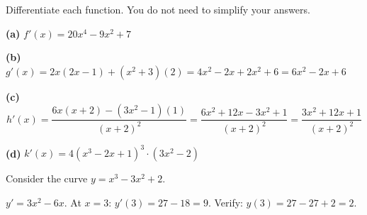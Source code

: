 \documentclass[addpoints]{exam}
\begin{document}
\begin{questions}
\question Differentiate each function. You do not need to simplify your answers.
\begin{solution}[8cm]
\textbf{(a)} $f'(x) = 20x^4 - 9x^2 + 7$

\textbf{(b)} $g'(x) = 2x(2x-1) + (x^2+3)(2) = 4x^2 - 2x + 2x^2 + 6 = 6x^2 - 2x + 6$

\textbf{(c)}
\[
h'(x) = \frac{6x(x+2) - (3x^2-1)(1)}{(x+2)^2} = \frac{6x^2+12x - 3x^2+1}{(x+2)^2}
= \frac{3x^2 + 12x + 1}{(x+2)^2}
\]

\textbf{(d)} $k'(x) = 4(x^3 - 2x + 1)^3 \cdot (3x^2 - 2)$
\end{solution}

\question Consider the curve $y = x^3 - 3x^2 + 2$.
\begin{solution}[8cm]
$y' = 3x^2 - 6x$. \quad At $x = 3$: $y'(3) = 27 - 18 = 9$.\quad
Verify: $y(3) = 27 - 27 + 2 = 2$. \checkmark


\end{solution}
\end{questions}
\end{document}
